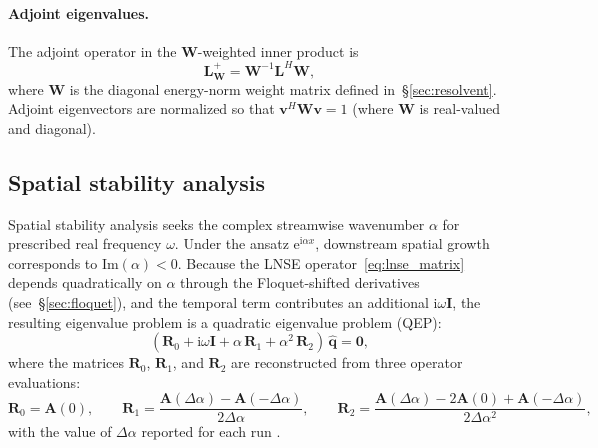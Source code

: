 \documentclass[11pt]{article}
\newcommand{\bq}{\mathbf{q}}
\newcommand{\bA}{\mathbf{A}}
\newcommand{\bI}{\mathbf{I}}
\newcommand{\bL}{\mathbf{L}}
\newcommand{\bR}{\mathbf{R}}
\newcommand{\bW}{\mathbf{W}}
\newcommand{\bv}{\mathbf{v}}
\begin{document}
\paragraph{Adjoint eigenvalues.}
The adjoint operator in the $\bW$-weighted inner product is
\begin{equation}
  \bL^+_{\bW} = \bW^{-1}\bL^H\bW,
  \label{eq:adjoint_op}
\end{equation}
where $\bW$ is the diagonal energy-norm weight matrix defined in~\S\ref{sec:resolvent}.
Adjoint eigenvectors are normalized so that $\bv^H\bW\bv = 1$ (where $\bW$ is real-valued and diagonal).

\subsection{Spatial stability analysis}
\label{sec:spatial}

Spatial stability analysis seeks the complex streamwise wavenumber $\alpha$ for prescribed real frequency $\omega$.
Under the ansatz $\mathrm{e}^{\mathrm{i}\alpha x}$, downstream spatial growth corresponds to $\mathrm{Im}(\alpha)<0$.
Because the LNSE operator~\eqref{eq:lnse_matrix} depends quadratically on $\alpha$ through the Floquet-shifted derivatives (see~\S\ref{sec:floquet}), and the temporal term contributes an additional $\mathrm{i}\omega\bI$, the resulting eigenvalue problem is a quadratic eigenvalue problem (QEP):
\begin{equation}
  (\bR_0 + \mathrm{i}\omega\bI + \alpha\,\bR_1 + \alpha^2\,\bR_2)\,\hat{\bq} = \bm{0},
  \label{eq:qep}
\end{equation}
where the matrices $\bR_0$, $\bR_1$, and $\bR_2$ are reconstructed from three operator evaluations:
\[
  \bR_0=\bA(0),\qquad
  \bR_1=\frac{\bA(\Delta\alpha)-\bA(-\Delta\alpha)}{2\Delta\alpha},\qquad
  \bR_2=\frac{\bA(\Delta\alpha)-2\bA(0)+\bA(-\Delta\alpha)}{2\Delta\alpha^2},
\]
with the value of $\Delta\alpha$ reported for each run \cite{malik1990numerical}.
\end{document}
